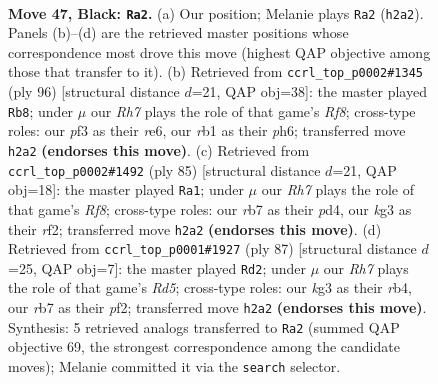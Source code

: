 \documentclass[11pt]{article}
\begin{document}
\clearpage

\begin{figure}[p]\centering
\begin{subfigure}{0.46\textwidth}\centering
\resizebox{\linewidth}{!}{%
\newchessgame
\chessboard[
  setfen={8/1R3p2/p3pk2/8/P3P3/5PKP/7r/1R6 b - - 1 47},
  showmover=false,
  pgfstyle=straightmove, color=movearrow, markmove={h2-a2}
]}
\caption{}
\end{subfigure}\hfill
\begin{subfigure}{0.46\textwidth}\centering
\resizebox{\linewidth}{!}{%
\newchessgame
\chessboard[
  setfen={5R2/1p2kp2/4r2p/2p5/8/1P4P1/2P2P2/5K2 w - - 1 49},
  showmover=false,
  pgfstyle=straightmove, color=movearrow, markmove={f8-b8}
]}
\caption{}
\end{subfigure}
\\[4pt]
\begin{subfigure}{0.46\textwidth}\centering
\resizebox{\linewidth}{!}{%
\newchessgame
\chessboard[
  setfen={8/1p6/1kp5/8/P2P2p1/4K3/2P2RP1/5r2 b - - 1 43},
  showmover=false,
  pgfstyle=straightmove, color=movearrow, markmove={f1-a1}
]}
\caption{}
\end{subfigure}\hfill
\begin{subfigure}{0.46\textwidth}\centering
\resizebox{\linewidth}{!}{%
\newchessgame
\chessboard[
  setfen={8/7p/6k1/6p1/pR1r4/P6P/1P3P2/5K2 b - - 5 44},
  showmover=false,
  pgfstyle=straightmove, color=movearrow, markmove={d4-d2}
]}
\caption{}
\end{subfigure}
\caption{\textbf{Move 47, Black: \texttt{Ra2}.} (a) Our position; Melanie plays \texttt{Ra2} (\texttt{h2a2}). Panels (b)--(d) are the retrieved master positions whose correspondence most drove this move (highest QAP objective among those that transfer to it). (b) Retrieved from \texttt{ccrl\_top\_p0002\#1345} (ply 96) [structural distance $d$=21, QAP obj=38]: the master played \texttt{Rb8}; under $\mu$ our \emph{Rh7} plays the role of that game's \emph{Rf8}; cross-type roles: our \emph{p}f3 as their \emph{r}e6, our \emph{r}b1 as their \emph{p}h6; transferred move \texttt{h2a2} \textbf{(endorses this move)}. (c) Retrieved from \texttt{ccrl\_top\_p0002\#1492} (ply 85) [structural distance $d$=21, QAP obj=18]: the master played \texttt{Ra1}; under $\mu$ our \emph{Rh7} plays the role of that game's \emph{Rf8}; cross-type roles: our \emph{r}b7 as their \emph{p}d4, our \emph{k}g3 as their \emph{r}f2; transferred move \texttt{h2a2} \textbf{(endorses this move)}. (d) Retrieved from \texttt{ccrl\_top\_p0001\#1927} (ply 87) [structural distance $d$=25, QAP obj=7]: the master played \texttt{Rd2}; under $\mu$ our \emph{Rh7} plays the role of that game's \emph{Rd5}; cross-type roles: our \emph{k}g3 as their \emph{r}b4, our \emph{r}b7 as their \emph{p}f2; transferred move \texttt{h2a2} \textbf{(endorses this move)}. Synthesis: 5 retrieved analogs transferred to \texttt{Ra2} (summed QAP objective 69, the strongest correspondence among the candidate moves); Melanie committed it via the \texttt{search} selector.}
\label{fig:thought-m93}
\end{figure}
\end{document}
